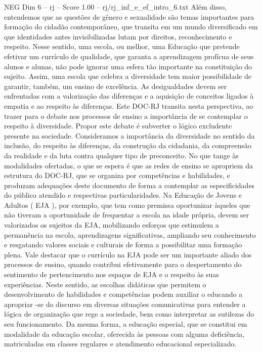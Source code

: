 \begin{textsample}{NEG Dim 6 – rj – Score 1.00 – rj/rj\_inf\_e\_ef\_intro\_6.txt}
Além disso, entendemos que as questões de gênero e sexualidade são temas importantes para formação do cidadão contemporâneo, que transita em um mundo diversificado em que identidades antes invisibilizadas lutam por direitos, reconhecimento e respeito.
Nesse sentido, uma escola, ou melhor, uma Educação que pretende efetivar um currículo de qualidade, que garanta a aprendizagem profícua de seus alunos e alunas, não pode ignorar uma esfera tão importante na constituição do sujeito.
Assim, uma escola que celebra a diversidade tem maior possibilidade de garantir, também, um ensino de excelência.
As desigualdades devem ser enfrentadas com a valorização das diferenças e a aquisição de conceitos ligados à empatia e ao respeito às diferenças.
Este DOC-RJ transita nesta perspectiva, ao trazer para o debate nos processos de ensino a importância de se contemplar o respeito à diversidade.
Propor este debate é subverter o lógico excludente presente na sociedade.
Consideramos a importância da diversidade no sentido da inclusão, do respeito às diferenças, da construção da cidadania, da compreensão da realidade e da luta contra qualquer tipo de preconceito.
No que tange às modalidades ofertadas, o que se espera é que as redes de ensino se apropriem da estrutura do DOC-RJ, que se organiza por competências e habilidades, e produzam adequações deste documento de forma a contemplar as especificidades do público atendido e respectivas particularidades.
Na Educação de Jovens e Adultos ( EJA ), por exemplo, que tem como premissa oportunizar àqueles que não tiveram a oportunidade de frequentar a escola na idade própria, devem ser valorizados os sujeitos da EJA, mobilizando esforços que estimulem a permanência na escola, aprendizagens significativas, ampliando seu conhecimento e resgatando valores sociais e culturais de forma a possibilitar uma formação plena.
Vale destacar que o currículo na EJA pode ser um importante aliado dos processos de ensino, quando contribui efetivamente para o despertamento do sentimento de pertencimento nos espaços de EJA e o respeito às suas experiências.
Neste sentido, as escolhas didáticas que permitem o desenvolvimento de habilidades e competências podem auxiliar o educando a apropriar -se do discurso em diversas situações comunicativas para entender a lógica de organização que rege a sociedade, bem como interpretar as sutilezas do seu funcionamento.
Da mesma forma, a educação especial, que se constitui em modalidade da educação escolar, oferecida às pessoas com alguma deficiência, matriculadas em classes regulares e atendimento educacional especializado.

\end{textsample}
